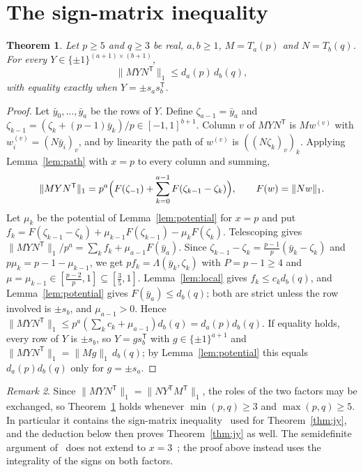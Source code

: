 \documentclass[11pt]{article}
\newtheorem{theorem}{Theorem}
\theoremstyle{remark}
\newtheorem{remark}[theorem]{Remark}
\begin{document}
\section{The sign-matrix inequality}
\begin{theorem}\label{thm:sign}
Let $p\ge5$ and $q\ge3$ be real, $a,b\ge1$, $M=T_a(p)$ and $N=T_b(q)$. For
every $Y\in\{\pm1\}^{(a+1)\times(b+1)}$,
\[
\|MYN^{\mathsf T}\|_1\le d_a(p)\,d_b(q),
\]
with equality exactly when $Y=\pm s_as_b^{\mathsf T}$.
\end{theorem}
\begin{proof}
Let $\bar y_0,\dots,\bar y_a$ be the rows of $Y$. Define $\zeta_{a-1}=\bar
y_a$ and $\zeta_{k-1}=(\zeta_k+(p-1)\bar y_k)/p\in[-1,1]^{b+1}$. Column $v$ of
$MYN^{\mathsf T}$ is $Mw^{(v)}$ with $w^{(v)}_i=(N\bar y_i)_v$, and by
linearity the path of $w^{(v)}$ is $((N\zeta_k)_v)_k$. Applying
Lemma~\ref{lem:path} with $x=p$ to every column and summing,
\[
\|MYN^{\mathsf T}\|_1=p^a\Bigl(F(\zeta_{-1})+\sum_{k=0}^{a-1}
F(\zeta_{k-1}-\zeta_k)\Bigr),\qquad F(w)=\|Nw\|_1.
\]
Let $\mu_k$ be the potential of Lemma~\ref{lem:potential} for $x=p$ and put
$f_k=F(\zeta_{k-1}-\zeta_k)+\mu_{k-1}F(\zeta_{k-1})-\mu_kF(\zeta_k)$.
Telescoping gives
$\|MYN^{\mathsf T}\|_1/p^a=\sum_kf_k+\mu_{a-1}F(\bar y_a)$. Since
$\zeta_{k-1}-\zeta_k=\frac{p-1}{p}(\bar y_k-\zeta_k)$ and
$p\mu_k=p-1-\mu_{k-1}$, we get $pf_k=\Lambda(\bar y_k,\zeta_k)$ with
$P=p-1\ge4$ and $\mu=\mu_{k-1}\in[\frac{p-2}{p},1]\subseteq[\frac35,1]$.
Lemma~\ref{lem:local} gives $f_k\le c_kd_b(q)$, and
Lemma~\ref{lem:potential} gives $F(\bar y_a)\le d_b(q)$; both are strict
unless the row involved is $\pm s_b$, and $\mu_{a-1}>0$. Hence
$\|MYN^{\mathsf T}\|_1\le p^a(\sum_kc_k+\mu_{a-1})d_b(q)=d_a(p)d_b(q)$.
If equality holds, every row of $Y$ is $\pm s_b$, so $Y=gs_b^{\mathsf T}$ with
$g\in\{\pm1\}^{a+1}$ and $\|MYN^{\mathsf T}\|_1=\|Mg\|_1\,d_b(q)$; by
Lemma~\ref{lem:potential} this equals $d_a(p)d_b(q)$ only for $g=\pm s_a$.
\end{proof}

\begin{remark}\label{rem:swap}
Since $\|MYN^{\mathsf T}\|_1=\|NY^{\mathsf T}M^{\mathsf T}\|_1$, the roles of
the two factors may be exchanged, so Theorem~\ref{thm:sign} holds whenever
$\min(p,q)\ge3$ and $\max(p,q)\ge5$. In particular it contains the sign-matrix
inequality~\cite[Lemma~4.1]{jy} used for Theorem~\ref{thm:jy}, and the
deduction below then proves Theorem~\ref{thm:jy} as well. The semidefinite
argument of~\cite{jy} does not extend to $x=3$~\cite[Remark~4.2]{jy}; the
proof above instead uses the integrality of the signs on both factors.
\end{remark}
\end{document}
